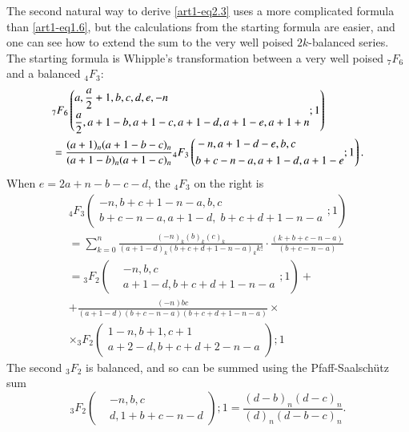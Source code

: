 The second natural way to derive \eqref{art1-eq2.3} uses a more complicated formula than \eqref{art1-eq1.6}, but the calculations from the starting formula are easier, and one can see how to extend the sum to the very well poised $2k$-balanced series. The starting formula is Whipple's transformation \cite{art1-key14} between a very well poised ${}_7F_6$ and a balanced $_4F_3$:
\begin{align}
& {}_7 F_6 
\left(\begin{aligned}
& a, \frac{a}{2} + 1, b, c, d, e, -n\\
& \frac{a}{2}, a + 1 - b, a + 1 - c, a + 1 - d, a+1-e, a + 1 + n 
\end{aligned}; 1
\right) \label{art1-eq2.5}\\
& = \frac{(a+1)_n (a+1-b-c)_n}{(a+1-b)_n (a+1-c)_n} {}_4 F_3
\left(\begin{aligned}
& -n, a + 1 -d -e, b, c\\
& b + c -n -a, a+1-d, a+1 -e
\end{aligned} ;1
\right). \notag
\end{align}
When $e = 2 a + n - b - c -d$, the ${}_4 F_3$ on the right is
\begin{gather*}
 {}_4 F_3 
\left(
\begin{aligned}
-n, b+ c + 1 - n -a, b,c\\
 b+ c -n -a, a+1 - d , \; b + c + d +1 - n -a
\end{aligned} ;1\right)\\
 = \sum\limits^n_{k=0} 
\frac{(-n)_k (b)_k (c)_k}{(a+1-d)_k (b+c + d +1-n -a)_k k!} \cdot \frac{(k+b+c-n-a)}{(b+c-n -a)}\\
= {}_3 F_2 
\left(
\begin{aligned}
& -n, b, c\\
& a+1-d, b + c +d +1 -n -a
\end{aligned} ; 1
\right) +\\
+ \frac{(-n) bc}{(a+1-d) (b+c -n -a) (b+c+d +1 -n -a)} \times \\
\times {}_3 F_2 
\left(
\begin{aligned}
1-n, b+1, c+1\\
a+2 -d, b+ c + d +2 -n -a
\end{aligned}
\right) ;1
\end{gather*}\pageoriginale
The second ${}_3 F_2$ is balanced, and so can be summed using the Pfaff-Saalsch\"utz sum
\begin{equation}
{}_3 F_2 
\left(\begin{aligned}
& -n, b, c\\
& d, 1+b + c - n -d 
\end{aligned}
\right);1 = \frac{(d-b)_n(d-c)_n}{(d)_n (d-b-c)_n} .
\label{art1-eq2.6}  
\end{equation}
